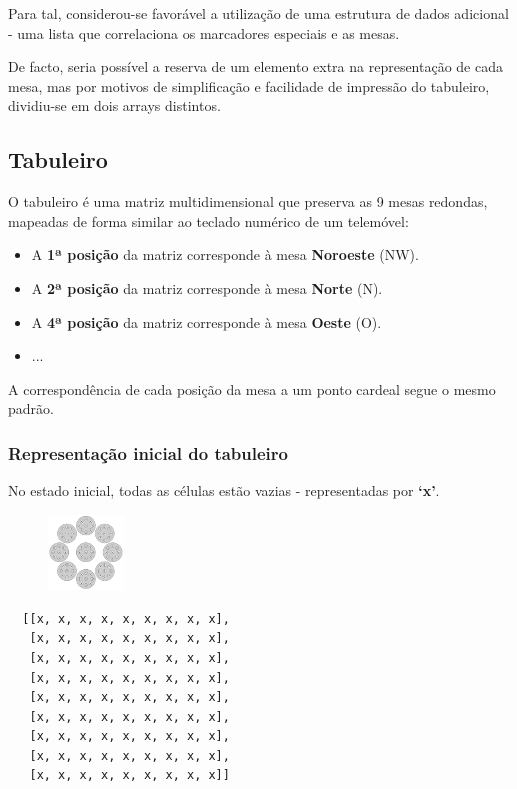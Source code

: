 \documentclass[a4paper]{article}
\begin{document}
Para tal, considerou-se favorável a utilização de uma estrutura de dados adicional - uma lista que correlaciona os marcadores especiais e as mesas.

De facto, seria possível a reserva de um elemento extra na representação de cada mesa, mas por motivos de simplificação e facilidade de impressão do tabuleiro, dividiu-se em dois arrays distintos.

\subsection{Tabuleiro}
O tabuleiro é uma matriz multidimensional que preserva as 9 mesas redondas, mapeadas de forma similar ao teclado numérico de um telemóvel:

\begin{itemize}
\itemsep0em
\item A \textbf{1ª posição} da matriz corresponde à mesa \textbf{Noroeste} (NW).
\item A \textbf{2ª posição} da matriz corresponde à mesa \textbf{Norte} (N).
\item A \textbf{4ª posição} da matriz corresponde à mesa \textbf{Oeste} (O).
\item ...
\end{itemize}

A correspondência de cada posição da mesa a um ponto cardeal segue o mesmo padrão.

\subsubsection{Representação inicial do tabuleiro}
No estado inicial, todas as células estão vazias - representadas por \textbf{`x'}.

\begin{figure}
\centering
\includegraphics[width=0.18\textwidth]{board-setup-1.png}
\end{figure}

\begin{lstlisting}
  [[x, x, x, x, x, x, x, x, x],
   [x, x, x, x, x, x, x, x, x],
   [x, x, x, x, x, x, x, x, x],
   [x, x, x, x, x, x, x, x, x],
   [x, x, x, x, x, x, x, x, x],
   [x, x, x, x, x, x, x, x, x],
   [x, x, x, x, x, x, x, x, x],
   [x, x, x, x, x, x, x, x, x],
   [x, x, x, x, x, x, x, x, x]]
\end{lstlisting}
\end{document}
